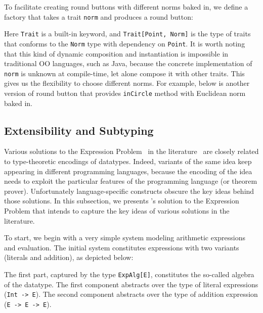 To facilitate creating round buttons with different norms baked in, we define a
factory that takes a trait \lstinline$norm$ and produces a round button:

Here \lstinline{Trait} is a built-in keyword, and \lstinline$Trait[Point, Norm]$
is the type of traits that conforms to the \lstinline$Norm$ type with dependency
on \lstinline{Point}. It is worth noting that this kind of dynamic composition
and instantiation is impossible in traditional OO languages, such as Java,
because the concrete implementation of \lstinline{norm} is unknown at
compile-time, let alone compose it with other traits. This gives us the
flexibility to choose different norms. For example, below is another version of
round button that provides \lstinline{inCircle} method with Euclidean norm baked
in.



\subsection{Extensibility and Subtyping}
\label{sec:extensibility}

Various solutions to the Expression Problem~\cite{wadler1998expression} in the
literature~\cite{finally-tagless,oliveira09modular,DelawareOS13,oliveira2012extensibility,
  swierstra:la-carte} are closely related to type-theoretic encodings of
datatypes. Indeed, variants of the same idea keep appearing in different
programming languages, because the encoding of the idea needs to exploit the
particular features of the programming language (or theorem prover).
Unfortunately language-specific constructs obscure the key ideas behind those
solutions. In this subsection, we presents \name's solution to the Expression
Problem that intends to capture the key ideas of various solutions in the
literature.

To start, we begin with a very simple system modeling arithmetic expressions and
evaluation. The initial system constitutes expressions with two variants
(literals and addition), as depicted below:

The first part, captured by the type \lstinline{ExpAlg[E]}, constitutes the
so-called algebra of the datatype. The first component abstracts over the type
of literal expressions (\lstinline{Int -> E}). The second component abstracts
over the type of addition expression (\lstinline{E -> E -> E}).


